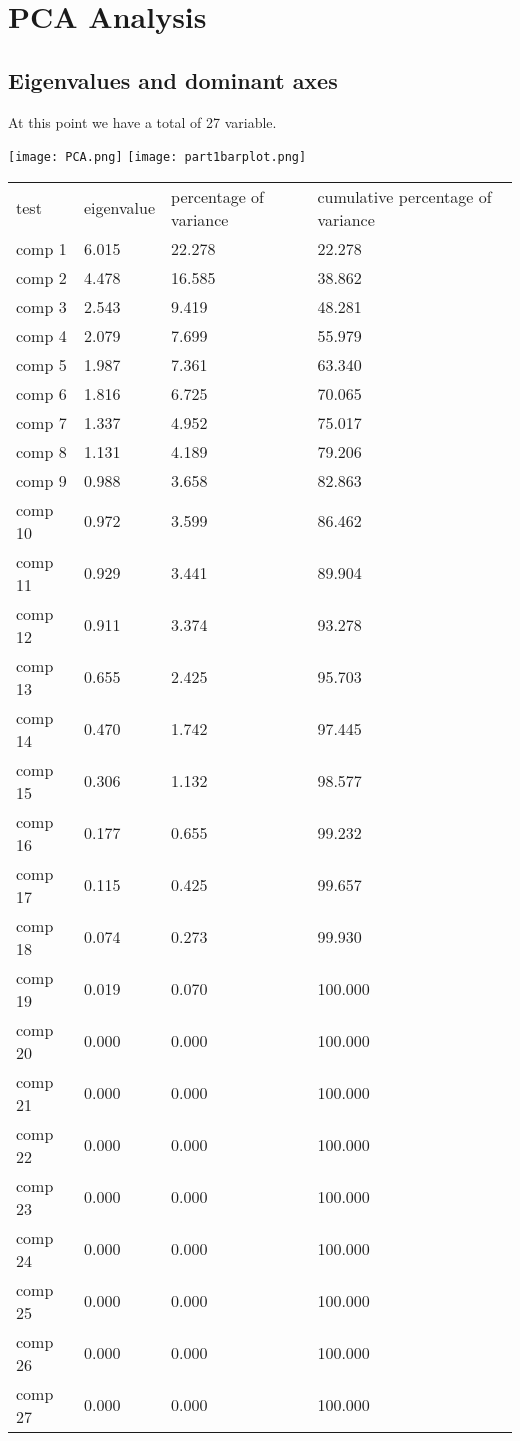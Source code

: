 \documentclass{article}
\begin{document}
\section{PCA Analysis}
\subsection{Eigenvalues and dominant axes}
At this point we have a total of 27 variable.

\texttt{[image: PCA.png]}
\texttt{[image: part1barplot.png]}

\label{my-label}
\begin{tabular}{llll}
test & eigenvalue & percentage of variance & cumulative percentage of variance \\
comp 1 & 6.015 & 22.278 & 22.278 \\
comp 2 & 4.478 & 16.585 & 38.862 \\
comp 3 & 2.543 &  9.419 & 48.281 \\
comp 4 & 2.079 &  7.699 & 55.979 \\
comp 5 & 1.987 &  7.361 & 63.340 \\
comp 6 & 1.816 &  6.725 & 70.065 \\
comp 7 & 1.337 &  4.952 & 75.017 \\
comp 8 & 1.131 &  4.189 & 79.206 \\
comp 9 & 0.988 &  3.658 & 82.863 \\
comp 10 & 0.972 &  3.599 & 86.462 \\
comp 11 & 0.929 &  3.441 & 89.904 \\
comp 12 & 0.911 &  3.374 & 93.278 \\
comp 13 & 0.655 &  2.425 & 95.703 \\
comp 14 & 0.470 &  1.742 & 97.445 \\
comp 15 & 0.306 &  1.132 & 98.577 \\
comp 16 & 0.177 &  0.655 & 99.232 \\
comp 17 & 0.115 &  0.425 & 99.657 \\
comp 18 & 0.074 &  0.273 & 99.930 \\
comp 19 & 0.019 &  0.070 & 100.000 \\
comp 20 & 0.000 &  0.000 & 100.000 \\
comp 21 & 0.000 &  0.000 & 100.000 \\
comp 22 & 0.000 &  0.000 & 100.000 \\
comp 23 & 0.000 &  0.000 & 100.000 \\
comp 24 & 0.000 &  0.000 & 100.000 \\
comp 25 & 0.000 &  0.000 & 100.000 \\
comp 26 & 0.000 &  0.000 & 100.000 \\
comp 27 & 0.000 &  0.000 & 100.000
\end{tabular}
\end{document}
